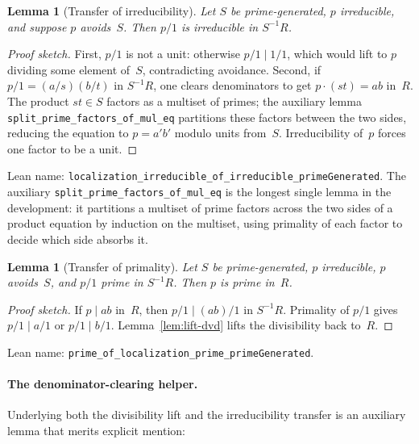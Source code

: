 \documentclass[11pt]{article}
\theoremstyle{plain}
\newtheorem{lemma}[theorem]{Lemma}
\theoremstyle{definition}
\theoremstyle{remark}
\newcommand{\li}[1]{\texorpdfstring{\texttt{#1}}{#1}}
\begin{document}
\medskip

\begin{lemma}[Transfer of irreducibility]\label{lem:transfer-irred}
Let $S$ be prime-generated, $p$ irreducible, and suppose $p$ avoids~$S$.  Then
$p/1$ is irreducible in $S^{-1}R$.
\end{lemma}

\begin{proof}[Proof sketch]
First, $p/1$ is not a unit: otherwise $p/1\mid 1/1$, which would lift to $p$
dividing some element of~$S$, contradicting avoidance.  Second, if
$p/1=(a/s)(b/t)$ in $S^{-1}R$, one clears denominators to get
$p\cdot(st)=ab$ in~$R$.  The product $st\in S$ factors as a multiset of
primes; the auxiliary lemma \li{split\_prime\_factors\_of\_mul\_eq} partitions
these factors between the two sides, reducing the equation to $p=a'b'$ modulo
units from~$S$.  Irreducibility of~$p$ forces one factor to be a unit.
\end{proof}

\noindent
Lean name:
\li{localization\_irreducible\_of\_irreducible\_primeGenerated}.
The auxiliary \li{split\_prime\_factors\_of\_mul\_eq} is the longest single
lemma in the development: it partitions a multiset of prime factors across the
two sides of a product equation by induction on the multiset, using primality
of each factor to decide which side absorbs it.

\medskip

\begin{lemma}[Transfer of primality]\label{lem:transfer-prime}
Let $S$ be prime-generated, $p$ irreducible, $p$ avoids~$S$, and $p/1$ prime
in $S^{-1}R$.  Then $p$ is prime in~$R$.
\end{lemma}

\begin{proof}[Proof sketch]
If $p\mid ab$ in~$R$, then $p/1\mid(ab)/1$ in $S^{-1}R$.  Primality of $p/1$
gives $p/1\mid a/1$ or $p/1\mid b/1$.  Lemma~\ref{lem:lift-dvd} lifts the
divisibility back to~$R$.
\end{proof}

\noindent
Lean name:
\li{prime\_of\_localization\_prime\_primeGenerated}.

\paragraph{The denominator-clearing helper.}
Underlying both the divisibility lift and the irreducibility transfer is an
auxiliary lemma that merits explicit mention:
\end{document}
